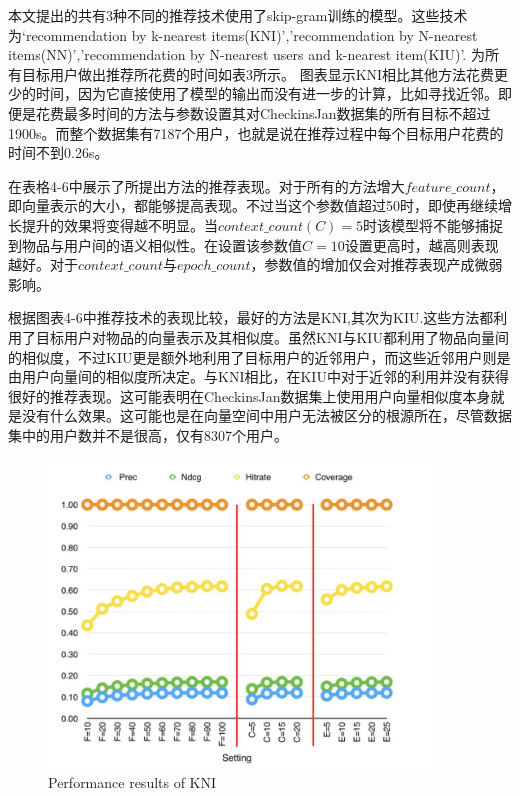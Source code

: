 \documentclass[UTF8]{ctexart}
\begin{document}
	本文提出的共有3种不同的推荐技术使用了skip-gram训练的模型。这些技术为‘recommendation by k-nearest items(KNI)’,'recommendation by N-nearest items(NN)','recommendation by N-nearest users and k-nearest item(KIU)'. 为所有目标用户做出推荐所花费的时间如表3所示。 图表显示KNI相比其他方法花费更少的时间，因为它直接使用了模型的输出而没有进一步的计算，比如寻找近邻。即便是花费最多时间的方法与参数设置其对CheckinsJan数据集的所有目标不超过1900s。而整个数据集有7187个用户，也就是说在推荐过程中每个目标用户花费的时间不到0.26s。
	
	在表格4-6中展示了所提出方法的推荐表现。对于所有的方法增大$feature\_count$，即向量表示的大小，都能够提高表现。不过当这个参数值超过50时，即使再继续增长提升的效果将变得越不明显。当$context\_count\left(C\right)=5$时该模型将不能够捕捉到物品与用户间的语义相似性。在设置该参数值$C=10$设置更高时，越高则表现越好。对于$context\_count$与$epoch\_count$，参数值的增加仅会对推荐表现产成微弱影响。
	
	根据图表4-6中推荐技术的表现比较，最好的方法是KNI,其次为KIU.这些方法都利用了目标用户对物品的向量表示及其相似度。虽然KNI与KIU都利用了物品向量间的相似度，不过KIU更是额外地利用了目标用户的近邻用户，而这些近邻用户则是由用户向量间的相似度所决定。与KNI相比，在KIU中对于近邻的利用并没有获得很好的推荐表现。这可能表明在CheckinsJan数据集上使用用户向量相似度本身就是没有什么效果。这可能也是在向量空间中用户无法被区分的根源所在，尽管数据集中的用户数并不是很高，仅有8307个用户。
	\begin{figure}
		\begin{center}
			\includegraphics[width=4in]{4}
		\end{center}
		\caption{Performance results of KNI}
	\end{figure}
	
\end{document}
